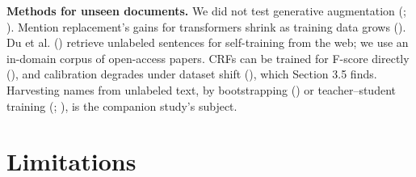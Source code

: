 \documentclass[11pt,a4paper]{article}
\begin{document}
\textbf{Methods for unseen documents.} We did not test generative augmentation
(\citealp{ding2020daga}; \citealp{zhou2022melm}). Mention replacement's gains for transformers
shrink as training data grows (\citealp{dai2020analysis}). Du et al.
(\citealp{du2021selftraining}) retrieve unlabeled sentences for self-training from
the web; we use an in-domain corpus of open-access papers. CRFs can be
trained for F-score directly (\citealp{suzuki2006training}), and calibration
degrades under dataset shift (\citealp{ovadia2019trust}), which Section 3.5 finds.
Harvesting names from unlabeled text, by bootstrapping
(\citealp{kozareva2006bootstrapping}) or teacher--student training (\citealp{wu2020teacher};
\citealp{qu2023adaptive}), is the companion study's subject.

\hypertarget{limitations}{%
\section{Limitations}\label{limitations}}
\end{document}
